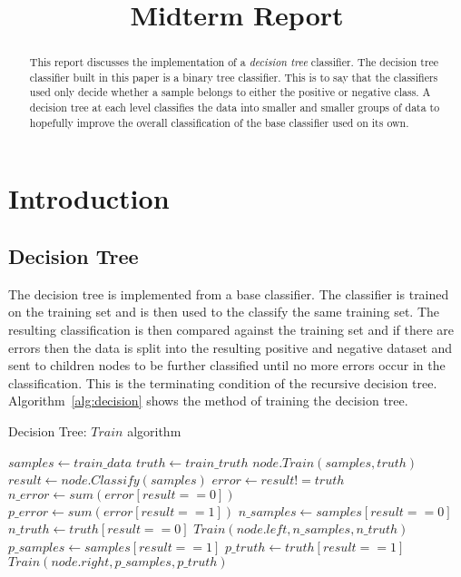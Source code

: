 \documentclass[letterpaper]{article}
\title{Midterm Report}
\begin{document}
\maketitle

\begin{abstract}
This report discusses the implementation of a \emph{decision tree} classifier. The decision tree classifier built in this paper is a binary tree classifier. This is to say that the classifiers used only decide whether a sample belongs to either the positive or negative class. A decision tree at each level classifies the data into smaller and smaller groups of data to hopefully improve the overall classification of the base classifier used on its own.
\end{abstract}

\section{Introduction}
\subsection{Decision Tree}
The decision tree is implemented from a base classifier. The classifier is trained on the training set and is then used to the classify the same training set. The resulting classification is then compared against the training set and if there are errors then the data is split into the resulting positive and negative dataset and sent to children nodes to be further classified until no more errors occur in the classification. This is the terminating condition of the recursive decision tree. Algorithm~\ref{alg:decision} shows the method of training the decision tree.

\begin{algorithm}
\caption{Decision Tree: $Train$ algorithm}
\label{alg:decision}
\begin{algorithmic}[1]
\STATE $samples \leftarrow train\_data$
\STATE $truth \leftarrow train\_truth$
\STATE $node.Train(samples, truth)$
\STATE $result \leftarrow node.Classify(samples)$
\STATE $error \leftarrow result != truth$
\STATE $n\_error \leftarrow sum(error[result == 0])$
\STATE $p\_error \leftarrow sum(error[result == 1])$
  \STATE $n\_samples \leftarrow samples[result == 0]$
  \STATE $n\_truth \leftarrow truth[result == 0]$
  \STATE $Train(node.left, n\_samples, n\_truth)$
\ENDIF
{}
  \STATE $p\_samples \leftarrow samples[result == 1]$
  \STATE $p\_truth \leftarrow truth[result == 1]$
  \STATE $Train(node.right, p\_samples, p\_truth)$
\ENDIF
\end{algorithmic}
\end{algorithm}
\end{document}
